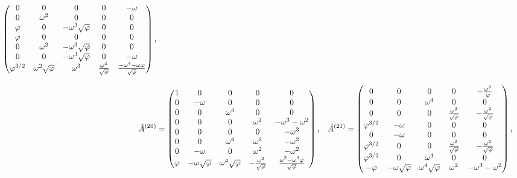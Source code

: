 \begin{align}
\begin{pmatrix}
    0 & 0 & 0 & 0 & -\omega \\
    0 & \omega^2 & 0 & 0 & 0 \\
    \varphi & 0 & -\omega^3\sqrt{\varphi} & 0 & 0 \\
    \varphi & 0 & 0 & 0 & 0 \\
    0 & \omega^2 & -\omega^3\sqrt{\varphi} & 0 & 0 \\
    0 & 0 & -\omega^3\sqrt{\varphi} & 0 & -\omega \\
    \varphi^{3/2} & \omega^2 \sqrt{\varphi} & \omega^3 & \frac{\omega^4}{\sqrt{\varphi}} & \frac{-\omega^4-\omega \varphi}{\sqrt{\varphi}} \\
  \end{pmatrix}, \notag \\[2ex]
  \tilde{A}^{(20)} &= \begin{pmatrix}
    1 & 0 & 0 & 0 & 0 \\
    0 & -\omega & 0 & 0 & 0 \\
    0 & 0 & \omega^4 & 0 & 0 \\
    0 & 0 & 0 & \omega^2 & -\omega^3-\omega^2 \\
    0 & 0 & 0 & 0 & -\omega^3 \\
    0 & 0 & \omega^4 & \omega^2 & -\omega^2 \\
    0 & -\omega & 0 & \omega^2 & -\omega^2 \\
    \varphi & -\omega\sqrt{\varphi} & \omega^4 \sqrt{\varphi} & -\frac{\omega^2}{\sqrt{\varphi}} & \frac{\omega^2-\omega^3 \varphi}{\sqrt{\varphi}} \\
  \end{pmatrix}, &
  \tilde{A}^{(21)} &= \begin{pmatrix}
    0 & 0 & 0 & 0 & -\frac{\omega^3}{\varphi} \\
    0 & 0 & \omega^4 & 0 & 0 \\
    0 & 0 & 0 & \frac{\omega^2}{\sqrt{\varphi}} & -\frac{\omega^2}{\sqrt{\varphi}} \\
    \varphi^{3/2} & -\omega & 0 & 0 & 0 \\
    0 & -\omega & 0 & 0 & 0 \\
    \varphi^{3/2} & 0 & 0 & \frac{\omega^2}{\sqrt{\varphi}} & -\frac{\omega^2}{\sqrt{\varphi}} \\
    \varphi^{3/2} & 0 & \omega^4 & 0 & 0 \\
    -\varphi & -\omega\sqrt{\varphi} & \omega^4 \sqrt{\varphi} & \omega^2 & -\omega^3-\omega^2 \\
  \end{pmatrix}, \notag \\[2ex]

\end{align}
